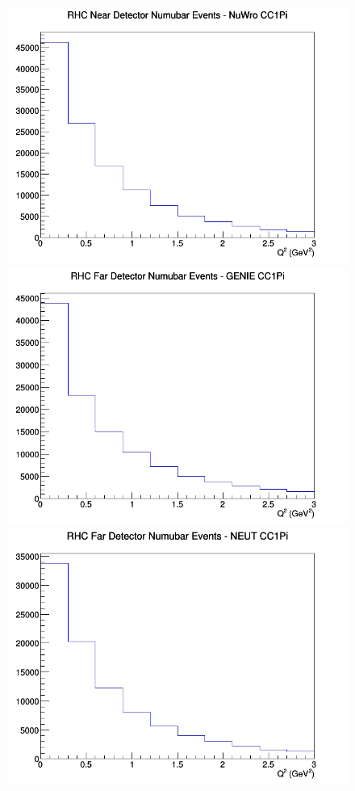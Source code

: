 \begin{figure}[h]
\includegraphics[width=\linewidth]{eff_Q2/GAr/CC1Pi_RHC_ND_numubar_Q2_NuWro.png}
\endminipage
\newline
{}
\includegraphics[width=\linewidth]{eff_Q2/GAr/CC1Pi_RHC_FD_numubar_Q2_GENIE.png}
\endminipage
{}
\includegraphics[width=\linewidth]{eff_Q2/GAr/CC1Pi_RHC_FD_numubar_Q2_NEUT.png}

\end{figure}
